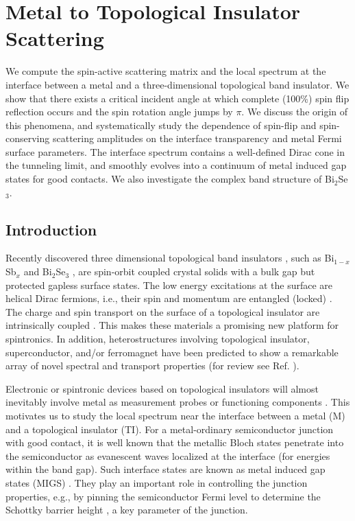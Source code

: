 \documentclass[11pt,revtex,aps]{report}
\begin{document}
\chapter{Metal to Topological Insulator Scattering}


We compute the spin-active scattering matrix and the local spectrum at the interface between a metal and a three-dimensional  topological band insulator. We show that there exists a critical incident angle at which complete (100\%) spin flip reflection occurs and the spin rotation angle jumps by $\pi$. We discuss the origin of this phenomena, and systematically study
the dependence of spin-flip and spin-conserving scattering amplitudes on
the interface transparency and metal Fermi surface parameters.
The interface spectrum contains a well-defined Dirac cone in the tunneling limit, and smoothly evolves into a continuum of metal induced gap states for good contacts. We also investigate the complex band structure of Bi$_2$Se$_3$.

\section{Introduction}
Recently discovered three dimensional topological band insulators \cite{fu07,moore,roy}, such as Bi$_{1-x}$Sb$_x$ \cite{Hsieh2008} and Bi$_2$Se$_3$ \cite{Xia09,zhang2009,Chen09}, are spin-orbit coupled crystal solids with a bulk gap but protected gapless surface states. The low energy excitations at the surface are helical Dirac fermions, i.e., their spin and momentum are entangled (locked) \cite{Hsieh2009}. The charge and spin transport on the surface of a topological insulator
are intrinsically coupled \cite{burkov}.
This makes these materials a promising new platform for spintronics. In addition, heterostructures involving topological insulator, superconductor, and/or ferromagnet have been predicted to show a remarkable array of novel spectral and transport properties (for review
see Ref. \cite{today,rmp,Qi-zhang-rev}). 

Electronic or spintronic devices based on topological insulators will almost inevitably involve metal as measurement probes or functioning components \cite{yokoyama09}. This motivates us to study the local spectrum near the interface between a metal (M) and a topological insulator (TI). For a metal-ordinary semiconductor junction with good contact, it is well known that the metallic Bloch states penetrate into the semiconductor as evanescent waves localized at the interface (for energies within the band gap). Such interface states are known as metal induced gap states (MIGS) \cite{heine65,cohen}. They play an important role in controlling the junction properties, e.g., by pinning the semiconductor Fermi level to determine the Schottky barrier height \cite{tersoff}, a key parameter of the junction.
\end{document}

